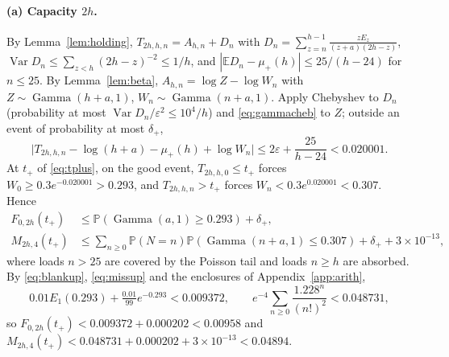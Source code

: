 \documentclass[11pt,a4paper]{article}
\theoremstyle{plain}
\theoremstyle{definition}
\theoremstyle{remark}
\newcommand{\Prob}{\mathbb P}
\newcommand{\E}{\mathbb E}
\newcommand{\Var}{\operatorname{Var}}
\newcommand{\eps}{\varepsilon}
\DeclareMathOperator{\Gam}{Gamma}
\begin{document}
\paragraph{(a) Capacity $2h$.} By Lemma~\ref{lem:holding}, $T_{2h,h,n}=A_{h,n}+D_n$ with $D_n=\sum_{z=n}^{h-1}\frac{zE_z}{(z+a)(2h-z)}$, $\Var D_n\le\sum_{z<h}(2h-z)^{-2}\le1/h$, and $|\E D_n-\mu_+(h)|\le25/(h-24)$ for $n\le25$. By Lemma~\ref{lem:beta}, $A_{h,n}=\log Z-\log W_n$ with $Z\sim\Gam(h+a,1)$, $W_n\sim\Gam(n+a,1)$. Apply Chebyshev to $D_n$ (probability at most $\Var D_n/\eps^2\le10^4/h$) and \eqref{eq:gammacheb} to $Z$; outside an event of probability at most $\delta_+$,
\begin{equation}\label{eq:goodplus}
\bigl|T_{2h,h,n}-\log(h+a)-\mu_+(h)+\log W_n\bigr|\le2\eps+\frac{25}{h-24}<0.020001.
\end{equation}
At $t_+$ of \eqref{eq:tplus}, on the good event, $T_{2h,h,0}\le t_+$ forces $W_0\ge0.3e^{-0.020001}>0.293$, and $T_{2h,h,n}>t_+$ forces $W_n<0.3e^{0.020001}<0.307$. Hence
\begin{align*}
F_{0,2h}(t_+)&\le\Prob(\Gam(a,1)\ge0.293)+\delta_+,\\
M_{2h,4}(t_+)&\le\sum_{n\ge0}\Prob(N=n)\Prob(\Gam(n+a,1)\le0.307)+\delta_++3\times10^{-13},
\end{align*}
where loads $n>25$ are covered by the Poisson tail and loads $n\ge h$ are absorbed. By \eqref{eq:blankup}, \eqref{eq:missup} and the enclosures of Appendix~\ref{app:arith},
\[
0.01E_1(0.293)+\tfrac{0.01}{99}e^{-0.293}<0.009372,\qquad e^{-4}\sum_{n\ge0}\frac{1.228^n}{(n!)^2}<0.048731,
\]
so $F_{0,2h}(t_+)<0.009372+0.000202<0.00958$ and $M_{2h,4}(t_+)<0.048731+0.000202+3\times10^{-13}<0.04894$.
\end{document}
